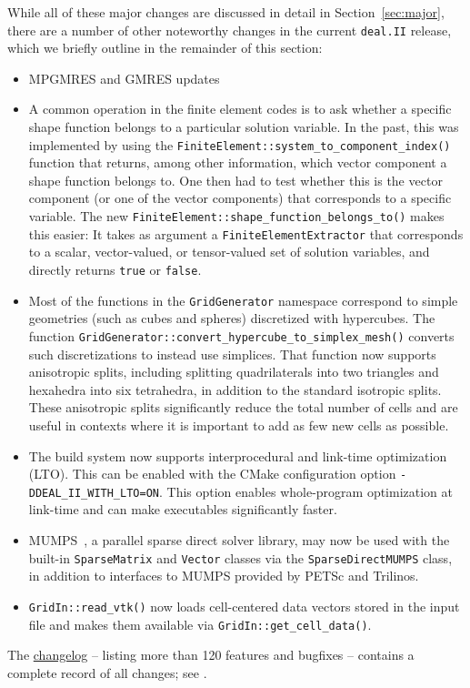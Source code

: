 \documentclass{ansarticle-preprint}
\newcommand{\specialword}[1]{\texttt{#1}}
\newcommand{\dealii}{{\specialword{deal.II}}\xspace}
\begin{document}
While all of these major changes are discussed in detail in
Section~\ref{sec:major}, there
are a number of other noteworthy changes in the current \dealii release,
which we briefly outline in the remainder of this section:
%
\begin{itemize}
\item MPGMRES and GMRES updates
\item A common operation in the finite element codes is to ask whether
  a specific shape function belongs to a particular solution
  variable. In the past, this was implemented by using the
  \texttt{FiniteElement::system\_to\_component\_index()} function that
  returns, among other information, which vector component a shape
  function belongs to. One then had to test whether this is the vector
  component (or one of the vector components) that corresponds to a
  specific variable. The new
  \texttt{FiniteElement::shape\_function\_belongs\_to()} makes this
  easier: It takes as argument a \texttt{FiniteElementExtractor} that
  corresponds to a scalar, vector-valued, or tensor-valued set of
  solution variables, and directly returns \texttt{true} or
  \texttt{false}.
\item Most of the functions in the \texttt{GridGenerator} namespace correspond
  to simple geometries (such as cubes and spheres) discretized with hypercubes.
  The function \texttt{GridGenerator::convert\_hypercube\_to\_simplex\_mesh()}
  converts such discretizations to instead use simplices. That function now
  supports anisotropic splits, including splitting quadrilaterals into two
  triangles and hexahedra into six tetrahedra, in addition to the standard
  isotropic splits. These anisotropic splits significantly reduce the total
  number of cells and are useful in contexts where it is important to add as few
  new cells as possible.
\item The build system now supports interprocedural and link-time optimization
  (LTO). This can be enabled with the CMake configuration option
  \texttt{-DDEAL\_II\_WITH\_LTO=ON}. This option enables whole-program
  optimization at link-time and can make executables significantly faster.
\item MUMPS~\cite{amestoy2019mumps}, a parallel sparse direct solver library,
  may now be used with the built-in \texttt{SparseMatrix} and \texttt{Vector} classes
  via the \texttt{SparseDirectMUMPS} class, in addition to interfaces to MUMPS
  provided by PETSc and Trilinos.
\item \texttt{GridIn::read\_vtk()} now loads cell-centered data vectors stored
  in the input file and makes them available via
  \texttt{GridIn::get\_cell\_data()}.
\end{itemize}
%
The
\href{https://dealii.org/current/doxygen/deal.II/changes_between_9_6_0_and_9_7_0.html}{changelog}
-- listing more than 120
features and bugfixes --
contains a complete record of all changes; see \cite{changes97}.
\end{document}
